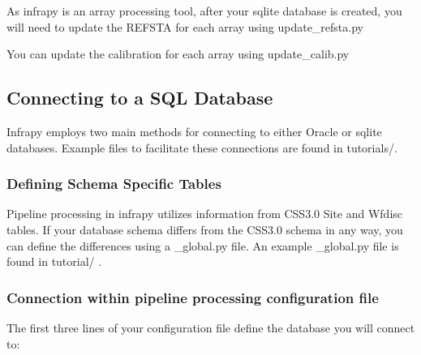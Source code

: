 \documentclass[letterpaper,10pt,english]{sphinxmanual}
\begin{document}
As infrapy is an array processing tool, after your sqlite database is created, you will need to update the REFSTA for each array using update\_refsta.py

\begin{sphinxVerbatim}[commandchars=\\\{\}]
    
\end{sphinxVerbatim}

You can update the calibration for each array using update\_calib.py

\begin{sphinxVerbatim}[commandchars=\\\{\}]
     
\end{sphinxVerbatim}


\subsection{Connecting to a SQL Database}
\label{\detokenize{pisces:connecting-to-a-sql-database}}
Infrapy employs two main methods for connecting to either Oracle or sqlite databases.  Example files to facilitate these connections are found in tutorials/.


\subsubsection{Defining Schema Specific Tables}
\label{\detokenize{pisces:defining-schema-specific-tables}}
Pipeline processing in infrapy utilizes information from CSS3.0 Site and Wfdisc tables.  If your database schema differs from the CSS3.0 schema in any way, you can define the differences using a \_global.py file.  An example \_global.py file is found in tutorial/ .


\subsubsection{Connection within pipeline processing configuration file}
\label{\detokenize{pisces:connection-within-pipeline-processing-configuration-file}}
The first three lines of your configuration file define the database you will connect to:
\end{document}

